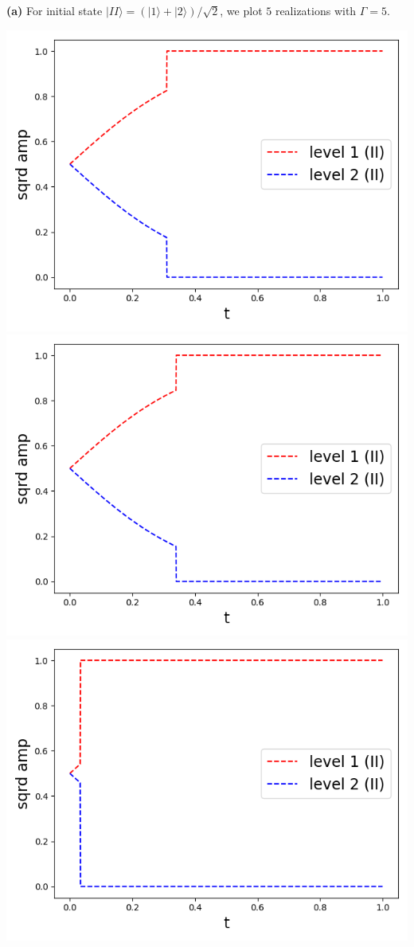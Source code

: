 \documentclass[11pt, oneside]{book}
\theoremstyle{break}
\theoremstyle{break}
\begin{document}
\newpage
\textbf{(a)} For initial state $|II\rangle = (|1\rangle+|2\rangle)/\sqrt{2}$, we plot $5$ realizations with $\Gamma = 5$. 
\begin{center}
\includegraphics[scale=0.39]{542HW2/II/1II_single.png}\qquad
\includegraphics[scale=0.39]{542HW2/II/2II_single.png}\qquad
\includegraphics[scale=0.39]{542HW2/II/3II_single.png}\qquad

\end{center}
\end{document}

